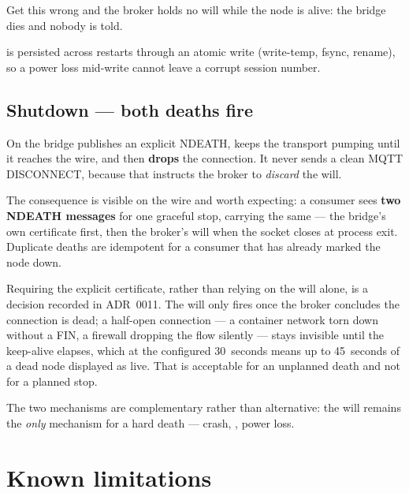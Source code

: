 Get this wrong and the broker holds no will while the node is alive: the bridge dies and
nobody is told.

 is persisted across restarts through an atomic write (write-temp, fsync,
rename), so a power loss mid-write cannot leave a corrupt session number.

\subsection{Shutdown --- both deaths fire}
\label{sec:contract-shutdown}

On  the bridge publishes an explicit NDEATH, keeps the transport pumping
until it reaches the wire, and then \textbf{drops} the connection. It never sends a clean
MQTT DISCONNECT, because that instructs the broker to \emph{discard} the will.

The consequence is visible on the wire and worth expecting: a consumer sees
\textbf{two NDEATH messages} for one graceful stop, carrying the same  ---
the bridge's own certificate first, then the broker's will when the socket closes at
process exit. Duplicate deaths are idempotent for a consumer that has already marked the
node down.

\begin{note}
Requiring the explicit certificate, rather than relying on the will alone, is a decision
recorded in ADR~0011. The will only fires once the broker concludes the connection is
dead; a half-open connection --- a container network torn down without a FIN, a firewall
dropping the flow silently --- stays invisible until the keep-alive elapses, which at the
configured 30~seconds means up to 45~seconds of a dead node displayed as live. That is
acceptable for an unplanned death and not for a planned stop.
\end{note}

The two mechanisms are complementary rather than alternative: the will remains the
\emph{only} mechanism for a hard death --- crash, , power loss.

\section{Known limitations}
\label{sec:contract-limits}


